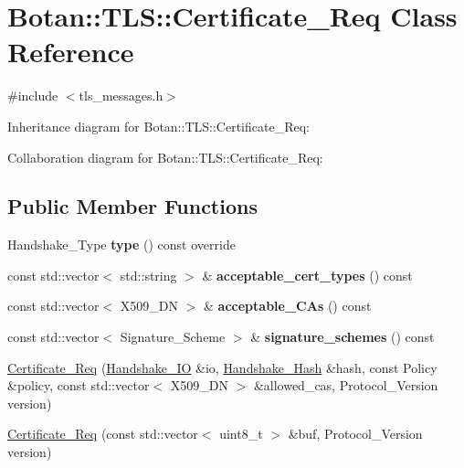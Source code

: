 \hypertarget{class_botan_1_1_t_l_s_1_1_certificate___req}{}\section{Botan\+:\+:T\+LS\+:\+:Certificate\+\_\+\+Req Class Reference}
\label{class_botan_1_1_t_l_s_1_1_certificate___req}


{\ttfamily \#include $<$tls\+\_\+messages.\+h$>$}



Inheritance diagram for Botan\+:\+:T\+LS\+:\+:Certificate\+\_\+\+Req\+:


Collaboration diagram for Botan\+:\+:T\+LS\+:\+:Certificate\+\_\+\+Req\+:
\subsection*{Public Member Functions}
\begin{DoxyCompactItemize}
\item 
\mbox{\label{class_botan_1_1_t_l_s_1_1_certificate___req_a4775bfa68f42b0cd5ca397af66f054ac}} 
Handshake\+\_\+\+Type {\bfseries type} () const override
\item 
\mbox{\label{class_botan_1_1_t_l_s_1_1_certificate___req_a91ad193bb1e925e44d96d5694df776ae}} 
const std\+::vector$<$ std\+::string $>$ \& {\bfseries acceptable\+\_\+cert\+\_\+types} () const
\item 
\mbox{\label{class_botan_1_1_t_l_s_1_1_certificate___req_adbe8291fd3d449658cb1b56fcf39f86c}} 
const std\+::vector$<$ X509\+\_\+\+DN $>$ \& {\bfseries acceptable\+\_\+\+C\+As} () const
\item 
\mbox{\label{class_botan_1_1_t_l_s_1_1_certificate___req_ac85d258c557adb28a4db14fe4b1e5bc8}} 
const std\+::vector$<$ Signature\+\_\+\+Scheme $>$ \& {\bfseries signature\+\_\+schemes} () const
\item 
\mbox{\hyperlink{class_botan_1_1_t_l_s_1_1_certificate___req_aceabb73e01693471af3201a7a81c0792}{Certificate\+\_\+\+Req}} (\mbox{\hyperlink{class_botan_1_1_t_l_s_1_1_handshake___i_o}{Handshake\+\_\+\+IO}} \&io, \mbox{\hyperlink{class_botan_1_1_t_l_s_1_1_handshake___hash}{Handshake\+\_\+\+Hash}} \&hash, const Policy \&policy, const std\+::vector$<$ X509\+\_\+\+DN $>$ \&allowed\+\_\+cas, Protocol\+\_\+\+Version version)
\item 
\mbox{\hyperlink{class_botan_1_1_t_l_s_1_1_certificate___req_ad633ad08f5ccf7273534c3d952e32b8a}{Certificate\+\_\+\+Req}} (const std\+::vector$<$ uint8\+\_\+t $>$ \&buf, Protocol\+\_\+\+Version version)
\end{DoxyCompactItemize}


